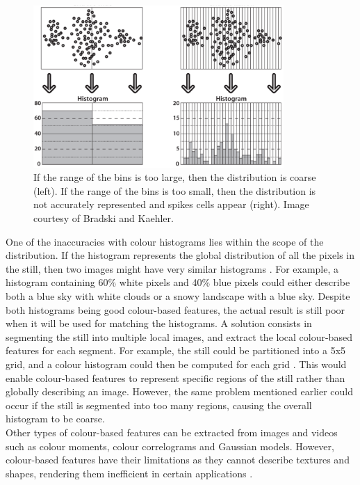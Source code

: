 \begin{figure}[h]
\centerline{\includegraphics[width=0.85\textwidth]{figures/litsurvey/histogram_bin_size.png}}
\caption{\label{fig:histogram-bin-size}If the range of the bins is too large, then the distribution is coarse (left). If the range of the bins is too small, then the distribution is not accurately represented and spikes cells appear (right). Image courtesy of Bradski and Kaehler.}
\end{figure}

One of the inaccuracies with colour histograms lies within the scope of the distribution. If the histogram represents the global distribution of all the pixels in the still, then two images might have very similar histograms \cite{petkovic2000}. For example, a histogram containing 60\% white pixels and 40\% blue pixels could either describe both a blue sky with white clouds or a snowy landscape with a blue sky. Despite both histograms being good colour-based features, the actual result is still poor when it will be used for matching the histograms. A solution consists in segmenting the still into multiple local images, and extract the local colour-based features for each segment. For example, the still could be partitioned into a 5x5 grid, and a colour histogram could then be computed for each grid \cite{yan2007review}. This would enable colour-based features to represent specific regions of the still rather than globally describing an image. However, the same problem mentioned earlier could occur if the still is segmented into too many regions, causing the overall histogram to be coarse.\\

Other types of colour-based features can be extracted from images and videos such as colour moments, colour correlograms \cite{huang1997correlograms} and Gaussian models. However, colour-based features have their limitations as they cannot describe textures and shapes, rendering them inefficient in certain applications \cite{hu2011survey}.


